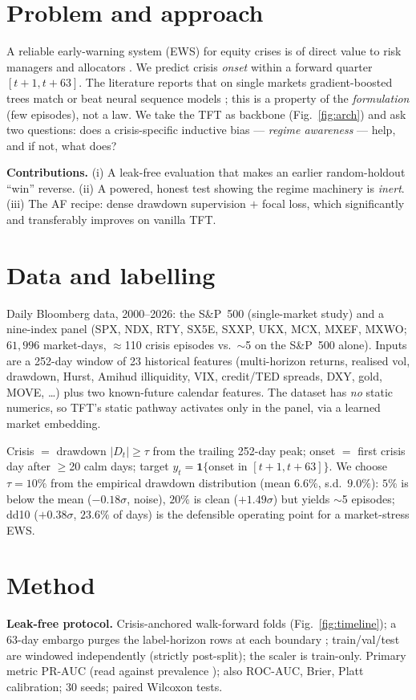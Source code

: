 \documentclass[10pt,a4paper,twocolumn]{article}
\newcommand{\prauc}{\mbox{PR-AUC}}
\newcommand{\rocauc}{\mbox{ROC-AUC}}
\begin{document}
\section{Problem and approach}
A reliable early-warning system (EWS) for equity crises is of direct value to
risk managers and allocators \citep{kaminsky1999leading}. We predict crisis
\emph{onset} within a forward quarter $[t{+}1,t{+}63]$. The literature reports
that on single markets gradient-boosted trees match or beat neural sequence
models \citep{bluwstein2023credit,holopainen2017toward}; this is a property of
the \emph{formulation} (few episodes), not a law. We take the TFT
\citep{lim2021tft} as backbone (Fig.~\ref{fig:arch}) and ask two questions:
does a crisis-specific inductive bias --- \emph{regime awareness} --- help, and
if not, what does?

\textbf{Contributions.} (i) A leak-free evaluation that makes an earlier
random-holdout ``win'' reverse. (ii) A powered, honest test showing the regime
machinery is \emph{inert}. (iii) The AF recipe: dense drawdown supervision $+$
focal loss, which significantly and transferably improves on vanilla TFT.

\section{Data and labelling}
Daily Bloomberg data, 2000--2026: the S\&P~500 (single-market study) and a
nine-index panel (SPX, NDX, RTY, SX5E, SXXP, UKX, MCX, MXEF, MXWO; $61{,}996$
market-days, $\approx$110 crisis episodes vs.\ $\sim$5 on the S\&P~500 alone).
Inputs are a 252-day window of 23 historical features (multi-horizon returns,
realised vol, drawdown, Hurst, Amihud illiquidity, VIX, credit/TED spreads,
DXY, gold, MOVE, \dots) plus two known-future calendar features. The dataset
has \emph{no} static numerics, so TFT's static pathway activates only in the
panel, via a learned market embedding.

Crisis $=$ drawdown $|D_t|\ge\tau$ from the trailing 252-day peak; onset $=$
first crisis day after $\ge$20 calm days; target $y_t=\mathbf{1}\{$onset in
$[t{+}1,t{+}63]\}$. We choose $\tau{=}10\%$ from the empirical drawdown
distribution (mean $6.6\%$, s.d.\ $9.0\%$): $5\%$ is below the mean
($-0.18\sigma$, noise), $20\%$ is clean ($+1.49\sigma$) but yields $\sim$5
episodes; dd10 ($+0.38\sigma$, $23.6\%$ of days) is the defensible operating
point for a market-stress EWS.

\section{Method}
\textbf{Leak-free protocol.} Crisis-anchored walk-forward folds
(Fig.~\ref{fig:timeline}); a 63-day embargo purges the label-horizon rows at
each boundary \citep{lopezdeprado2018}; train/val/test are windowed
independently (strictly post-split); the scaler is train-only. Primary metric
$\prauc$ (read against prevalence \citep{saito2015prc}); also $\rocauc$, Brier,
Platt calibration; 30 seeds; paired Wilcoxon tests.
\end{document}
